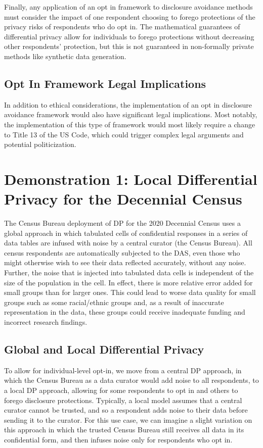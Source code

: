 \documentclass[
]{urban-formatting}
\begin{document}
Finally, any application of an opt in framework to disclosure avoidance
methods must consider the impact of one respondent choosing to forego
protections of the privacy risks of respondents who do opt in. The
mathematical guarantees of differential privacy allow for individuals to
forego protections without decreasing other respondents' protection, but
this is not guaranteed in non-formally private methods like synthetic
data generation.

\subsection{Opt In Framework Legal Implications}

In addition to ethical considerations, the implementation of an opt in
disclosure avoidance framework would also have significant legal
implications. Most notably, the implementation of this type of framework
would most likely require a change to Title 13 of the US Code, which
could trigger complex legal arguments and potential politicization.

\section{Demonstration 1: Local Differential Privacy for the Decennial Census}

The Census Bureau deployment of DP for the 2020 Decennial Census uses a
global approach in which tabulated cells of confidential responses in a
series of data tables are infused with noise by a central curator (the
Census Bureau). All census respondents are automatically subjected to
the DAS, even those who might otherwise wish to see their data reflected
accurately, without any noise. Further, the noise that is injected into
tabulated data cells is independent of the size of the population in the
cell. In effect, there is more relative error added for small groups
than for larger ones. This could lead to worse data quality for small
groups such as some racial/ethnic groups and, as a result of inaccurate
representation in the data, these groups could receive inadequate
funding and incorrect research findings.

\subsection{Global and Local Differential Privacy}

To allow for individual-level opt-in, we move from a central DP
approach, in which the Census Bureau as a data curator would add noise
to all respondents, to a local DP approach, allowing for some
respondents to opt in and others to forego disclosure protections.
Typically, a local model assumes that a central curator cannot be
trusted, and so a respondent adds noise to their data before sending it
to the curator. For this use case, we can imagine a slight variation on
this approach in which the trusted Census Bureau still receives all data
in its confidential form, and then infuses noise only for respondents
who opt in.
\end{document}
